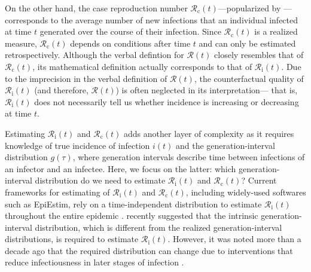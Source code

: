\documentclass[12pt]{article}
\newcommand{\Rx}[1]{\ensuremath{{\mathcal R}_{#1}}\xspace}
\newcommand{\Rc}{\Rx{\mathrm{c}}}
\newcommand{\Ri}{\Rx{\mathrm{i}}}
\newcommand{\RR}{\ensuremath{{\mathcal R}}\xspace}
\begin{document}
On the other hand, the case reproduction number $\Rc(t)$---popularized by \cite{wallinga2004different}---corresponds to the average number of new infections that an individual infected at time $t$ generated over the course of their infection.
Since $\Rc(t)$ is a realized measure, $\Rc(t)$ depends on conditions after time $t$ and can only be estimated retrospectively.
Although the verbal defintion for $\RR(t)$ closely resembles that of $\Rc(t)$, its mathematical definition actually corresponds to that of $\Ri(t)$.
Due to the imprecision in the verbal definition of $\RR(t)$, the counterfactual quality of $\Ri(t)$ (and therefore, $\RR(t)$) is often neglected in its interpretation---
that is, $\Ri(t)$ does not necessarily tell us whether incidence is increasing or decreasing at time $t$.

Estimating $\Ri(t)$ and $\Rc(t)$ adds another layer of complexity as it requires knowledge of true incidence of infection $i(t)$ and the generation-interval distribution $g(\tau)$, where generation intervals describe time between infections of an infector and an infectee.
Here, we focus on the latter: which generation-interval distribution do we need to estimate $\Ri(t)$ and $\Rc(t)$?
Current frameworks for estimating of $\Ri(t)$ and $\Rc(t)$, including widely-used softwares such as EpiEstim, rely on a time-independent distribution to estimate $\Ri(t)$ throughout the entire epidemic \citep{cori2013new}.
\cite{gostic2020practical} recently suggested that the intrinsic generation-interval distribution, which is different from the realized generation-interval distributions, is required to estimate $\Ri(t)$.
However, it was noted more than a decade ago that the required distribution can change due to interventions that reduce infectiousness in later stages of infection \citep{fraser2007estimating}.
\end{document}
